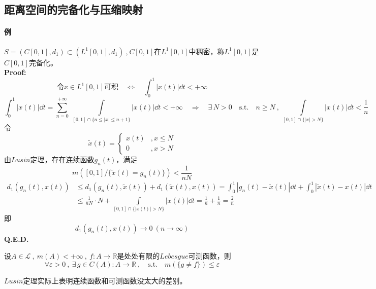 \subsection{距离空间的完备化与压缩映射} \label{zip}
\paragraph*{例} \quad $S=(C[0,1],d_1) \subset (L^1[0,1],d_1) \ $,$ \ C[0,1]$在$L^1[0,1]$中稠密，称$L^1[0,1]$是$C[0,1]$完备化。\\
\textbf{Proof:}
\[\text{令}x \in L^1[0,1]\text{可积} \quad \Leftrightarrow \quad \int_0^1|x(t)|\dd t<+\infty\]
\[\int_0^1|x(t)|\dd t=\sum_{n=0}^{+\infty} \ \int\limits_{[0,1]\cap\{n \leq |x| \leq n+1\}}|x(t)|\dd t<+\infty \quad \Rightarrow \quad \exists \, N>0 \quad \text{s.t.} \quad n \geq N \ , \ \int\limits_{[0,1]\cap\{|x|>N\}}|x(t)|\dd t<\frac{1}{n}\]
令
\[\tilde{x}(t)=\left \{
\begin{array}{ll}
    x(t) & , x \leq N \\ 0 & , x>N
\end{array}    
\right .\]
由$Lusin$定理，存在连续函数$g_n(t)$，满足
\[m([0,1]/\{\tilde{x}(t)=g_n(t)\})<\frac{1}{nN}\]
\begin{equation*}
    \begin{aligned}
        d_1(g_n(t),x(t)) & \leq d_1(g_n(t),\tilde{x}(t))+d_1(\tilde{x}(t),x(t))=\int_0^1|g_n(t)-\tilde{x}(t)|\dd t+\int_0^1|\tilde{x}(t)-x(t)|\dd t \\
        & \leq \frac{1}{nN} \cdot N+\int\limits_{[0,1]\cap\{|x(t)|>N\}}|x(t)|\dd t=\frac{1}{n}+\frac{1}{n}=\frac{2}{n}
    \end{aligned}
\end{equation*}
即
\[d_1(g_n(t),x(t)) \to 0 \ (n \to \infty)\]
\textbf{Q.E.D.}
\begin{theorem}[$Lusin$定理]
    设$A \in \mathscr{L} \ , \ m(A)<+\infty \ , \ f:A \to \mathbb{R}$是处处有限的$Lebesgue$可测函数，则
    \[\forall \varepsilon>0 \ , \ \exists \, g \in C(A):A\to \mathbb{R} \ , \quad \text{s.t.} \quad m(\{g \neq f\}) \leq \varepsilon\]
\end{theorem}
$Lusin$定理实际上表明连续函数和可测函数没太大的差别。

